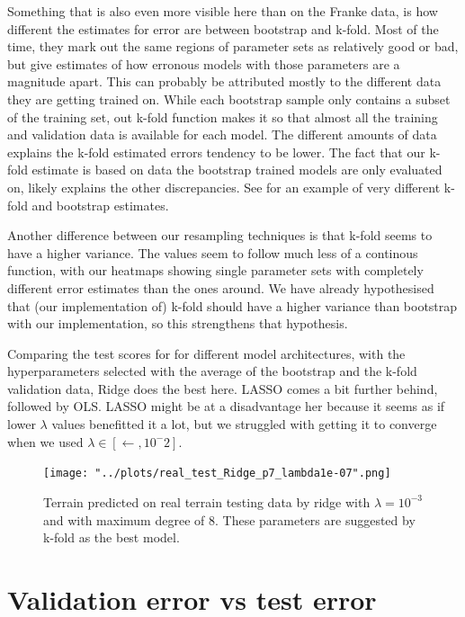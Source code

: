 \documentclass[11pt, a4paper]{report}
\begin{document}
Something that is also even more visible here than on the Franke data, is how different the estimates for error are between bootstrap and k-fold. Most of the time, they mark out the same regions of parameter sets as relatively good or bad, but give estimates of how erronous models with those parameters are a magnitude apart. This can probably be attributed mostly to the different data they are getting trained on. While each bootstrap sample only contains a subset of the training set, out k-fold function makes it so that almost all the training and validation data is available for each model. The different amounts of data explains the k-fold estimated errors tendency to be lower. The fact that our k-fold estimate is based on data the bootstrap trained models are only evaluated on, likely explains the other discrepancies. See  for an example of very different k-fold and bootstrap estimates.

Another difference between our resampling techniques is that k-fold seems to have a higher variance. The values seem to follow much less of a continous function, with our heatmaps showing single parameter sets with completely different error estimates than the ones around. We have already hypothesised that (our implementation of) k-fold should have a higher variance than bootstrap with our implementation, so this strengthens that hypothesis.

Comparing the test scores for for different model architectures, with the hyperparameters selected with the average of the bootstrap and the k-fold validation data, Ridge does the best here. LASSO comes a bit further behind, followed by OLS. LASSO might be at a disadvantage her because it seems as if lower $\lambda$ values benefitted it a lot, but we struggled with getting it to converge when we used $\lambda \in [\leftarrow, 10^-2]$.

\begin{figure}
\texttt{[image: "../plots/real\_test\_Ridge\_p7\_lambda1e-07".png]}
\caption{Terrain predicted on real terrain testing data by ridge with $\lambda = 10^{-3}$ and with maximum degree of $8$. These parameters are suggested by k-fold as the best model.}
\label{fig:ridge_kfold_best_real}
\end{figure}

\section{Validation error vs test error}
\end{document}

